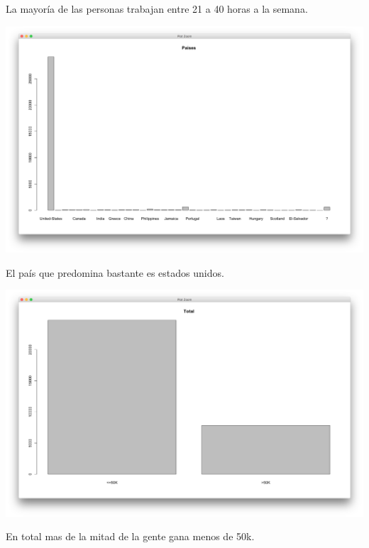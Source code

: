 \documentclass{article}
\begin{document}
  La mayoría de las personas trabajan entre 21 a 40 horas a la semana.
  \begin{center}
    \hbox{\hspace{-5.5em}\includegraphics[scale=0.4]{graficas/paisesP}}
  \end{center}
  El país que predomina bastante es estados unidos.
  \begin{center}
    \hbox{\hspace{-5.5em}\includegraphics[scale=0.4]{graficas/totalP}}
  \end{center}
  En total mas de la mitad de la gente gana menos de 50k.
\end{document}

